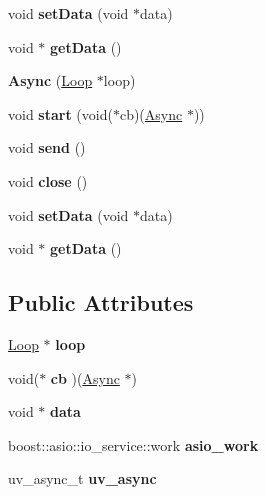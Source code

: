 \begin{DoxyCompactItemize}
void {\bfseries set\+Data} (void $\ast$data)
\item 
\mbox{\label{struct_async_a0aeb784d89f749c2139fd9da075deb45}} 
void $\ast$ {\bfseries get\+Data} ()
\item 
\mbox{\label{struct_async_aed26c1fc97a5eae80339fe5fce86b40a}} 
{\bfseries Async} (\mbox{\hyperlink{struct_loop}{Loop}} $\ast$loop)
\item 
\mbox{\label{struct_async_a9a11c2cc0df4ea36fbede66b76344e89}} 
void {\bfseries start} (void($\ast$cb)(\mbox{\hyperlink{struct_async}{Async}} $\ast$))
\item 
\mbox{\label{struct_async_af2c3b9163ed54bc50210f627ca7451ff}} 
void {\bfseries send} ()
\item 
\mbox{\label{struct_async_a8ef8b28a1f9c5900c3962d99b92393ca}} 
void {\bfseries close} ()
\item 
\mbox{\label{struct_async_a037220bb081dea52ad225c64e5810d1b}} 
void {\bfseries set\+Data} (void $\ast$data)
\item 
\mbox{\label{struct_async_a0aeb784d89f749c2139fd9da075deb45}} 
void $\ast$ {\bfseries get\+Data} ()
\end{DoxyCompactItemize}
\subsection*{Public Attributes}
\begin{DoxyCompactItemize}
\item 
\mbox{\label{struct_async_a11a844278b511f9775e7c16ca5d024aa}} 
\mbox{\hyperlink{struct_loop}{Loop}} $\ast$ {\bfseries loop}
\item 
\mbox{\label{struct_async_af860a13f30ff5be98cf363ad5859a4be}} 
void($\ast$ {\bfseries cb} )(\mbox{\hyperlink{struct_async}{Async}} $\ast$)
\item 
\mbox{\label{struct_async_a7d2b98fff1a52d9fafe8aa4b8425ad2d}} 
void $\ast$ {\bfseries data}
\item 
\mbox{\label{struct_async_a85d4874c03669a09158cb8b4120d685a}} 
boost\+::asio\+::io\+\_\+service\+::work {\bfseries asio\+\_\+work}
\item 
\mbox{\label{struct_async_aa2372f3193912cf0dc7f9eb57531348a}} 
uv\+\_\+async\+\_\+t {\bfseries uv\+\_\+async}
\end{DoxyCompactItemize}
